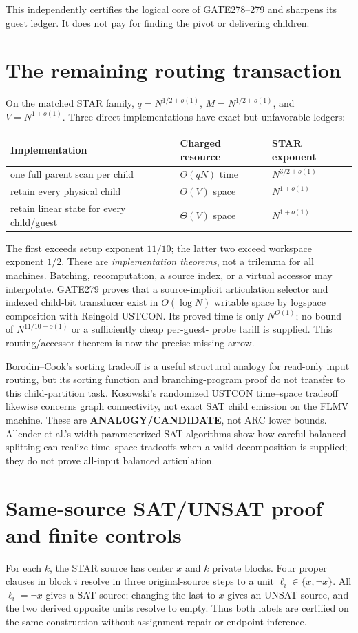 \documentclass[11pt]{article}
\begin{document}
This independently certifies the logical core of GATE278--279 and sharpens its
guest ledger.  It does not pay for finding the pivot or delivering children.

\section{The remaining routing transaction}
On the matched STAR family, $q=N^{1/2+o(1)}$,
$M=N^{1/2+o(1)}$, and $V=N^{1+o(1)}$.  Three direct implementations have exact
but unfavorable ledgers:
\begin{center}\small
\begin{tabular}{lll}
\toprule
Implementation & Charged resource & STAR exponent\\\midrule
one full parent scan per child & $\Theta(qN)$ time & $N^{3/2+o(1)}$\\
retain every physical child & $\Theta(V)$ space & $N^{1+o(1)}$\\
retain linear state for every child/guest & $\Theta(V)$ space & $N^{1+o(1)}$\\
\bottomrule
\end{tabular}
\end{center}
The first exceeds setup exponent $11/10$; the latter two exceed workspace
exponent $1/2$.  These are \emph{implementation theorems}, not a trilemma for
all machines.  Batching, recomputation, a source index, or a virtual accessor
may interpolate.  GATE279 proves that a source-implicit articulation selector
and indexed child-bit transducer exist in $O(\log N)$ writable space by
logspace composition with Reingold USTCON.  Its proved time is only
$N^{O(1)}$; no bound of $N^{11/10+o(1)}$ or a sufficiently cheap per-guest-
probe tariff is supplied.  This routing/accessor theorem is now the precise
missing arrow.

Borodin--Cook's sorting tradeoff is a useful structural analogy for read-only
input routing, but its sorting function and branching-program proof do not
transfer to this child-partition task.  Kosowski's randomized USTCON
time--space tradeoff likewise concerns graph connectivity, not exact SAT child
emission on the FLMV machine.  These are \textbf{ANALOGY/CANDIDATE}, not ARC
lower bounds.  Allender et al.'s width-parameterized SAT algorithms show how
careful balanced splitting can realize time--space tradeoffs when a valid
decomposition is supplied; they do not prove all-input balanced articulation.

\section{Same-source SAT/UNSAT proof and finite controls}
For each $k$, the STAR source has center $x$ and $k$ private blocks.  Four
proper clauses in block $i$ resolve in three original-source steps to a unit
$\ell_i\in\{x,\neg x\}$.  All $\ell_i=\neg x$ gives a SAT source; changing the
last to $x$ gives an UNSAT source, and the two derived opposite units resolve
to empty.  Thus both labels are certified on the same construction without
assignment repair or endpoint inference.
\end{document}
